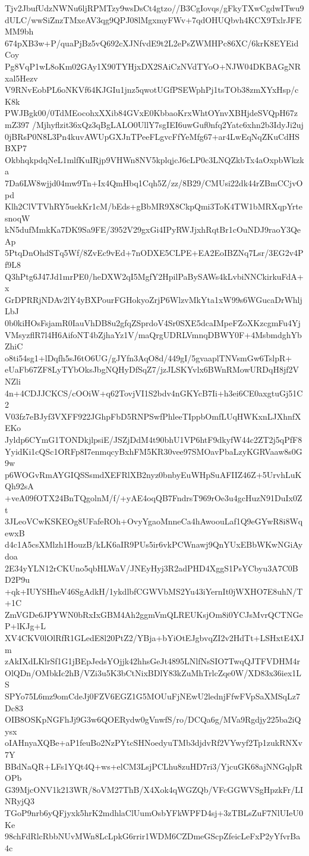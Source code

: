 Tjv2JbufUdzNWNu6ljRPMTzy9wsDsCt4gtzo//B3CgIovqs/gFkyTXwCgdwITwu9
dULC/wwSiZnzTMxeAV3qg9QPJ08lMgxmyFWv+7qdOHUQbvh4KCX9TxlrJFEMM9bh
674pXB3w+P/quaPjBz5vQ692cXJNfvdE9t2L2ePsZWMHPc86XC/6krK8EYEidCoy
Pg8VqP1wL8oKm02GAy1X90TYHjxDX2SAiCzNVdTYoO+NJW04DKBAGgNRxal5Hezv
V9RNvEobPL6oNKVf64KJGIu1jnz5qwotUGfPSEWphPj1tsTOb38zmXYxHsp/cK8k
PWJBgk00/0TdMEocohxXXib84GVxE0KbbaoKrxWhtOYnvXBHjdeSVQpH67zmZ397
/Mjhyflzit36xQz3qBgLALO0UllY7sgIEI6uwGuf0nfq2Yatc6xhn2b3IdyJi2uj
0jBRsP0N8L3Pn4kuvAWUpGXJnTPeeFLgvcFfYeMfg67+ar4LwEqNqZKuCdHSBXP7
OkbhqkpdqNeL1mlfKuIRjp9VHWn8NV5kplqjcJ6cLP0c3LNQZkbTx4aOxpbWkzka
7Da6LW8wjjd04mw9Tn+Ix4QmHbq1Cqh5Z/zz/8B29/CMUsi22dk44rZBmCCjvOpd
Klh2ClVTVhRY5uekKr1cM/bEds+gBbMR9X8CkpQmi3ToK4TW1bMRXqpYrtesnoqW
kN5dufMmkKa7DK9Sa9FE/3952V29gxGi4IPyRWJjxhRqtBr1cOuNDJ9raoY3QeAp
5PtqDnOhdSTq5Wf/8ZvEc9vEd+7nODXE5CLPE+EA2EoIBZNq7Lsr/3EG2v4Pf9L8
Q3hPtg6J47Jd1mrPE0/heDXW2qI5MgfY2HpilPaBySAWs4kLvbiNNCkirkuFdA+x
GrDPRRjNDAv2lY4yBXPourFGHokyoZrjP6WlzvMkYta1xW99s6WGucaDrWhljLbJ
0b0kiHOsFsjamR0IauVhDB8u2gfqZSprdoV4Sr0SXE5dcaIMpeFZoXKzcgmFu4Yj
VMsyzflR7l4H6AifoNT4bZjhaYz1V/maQrgUDRLVmnqDBWY0F+4MsbmdghYbZhiC
o8ti54sg1+lDqfh5sJ6tO6UG/gJYfn3AqO8d/449gI/5gvaaplTNVsmGw6TslpR+
eUaFb67ZF8LyTYbOksJbgNQHyDfSqZ7/jzJLSKYvlx6BWnRMowURDqH8jf2VNZli
4n+4CDJJCKCS/cOOiW+q62TovjVI1S2bdv4nGKYcB7Ii+h3ei6CE0axgtuGj51C2
V03fz7eBJyf3VXFF922JGhpFbD5RNPSwfPhleeTIppbOmfLUqHWKxnLJXhnfXEKo
Jyldp6CYmG1TONDkjlpsiE/JSZjDdM4t90bhU1VP6htF9dkyfW44c2ZT2j5qPfF8
YyidKi1cQSc1ORFp8I7enmqcyBxhFM5KR30vee97SMOavPbaLzyKGRVaaw8s0G9w
p6WOGvRmAYGIQSSsmdXEFRlXB2nyz0bnbyEuWHpSuAFIIZ46Z+5UrvhLuKQh92sA
+veA09fOTX24BnTQgolnM/f/+yAE4oqQB7FndrsT969rOe3u4gcHuzN91DuIx0Zt
3JLeoVCwKSKEOg8UFafeROh+OvyYgaoMnneCa4hAwoouLaf1Q9eGYwR8i8WqewxB
d4c1A5csXMlzh1HouzB/kLK6aIR9PUs5ir6vkPCWnawj9QnYUxEBbWKwNGiAydoa
2E34yYLN12rCKUno5qbHLWaV/JNEyHyj3R2adPHD4XggS1PsYCbyu3A7C0BD2P9u
+qk+IUYSHheV46SgAdkH/1ykdlbfCGWVbMS2Yu43iYernIt0jWXHO7E8uhN/T+1C
ZmVGDe6JPYWN0bRxIxGBM4Ah2ggmVmQLREUKsjOm8i0YCJsMvrQCTNGeP+lKJg+L
XV4CKV0lOlRfR1GLedE8l20PtZ2/YBja+bYiOtEJgbvqZI2v2HdTt+LSHxtE4XJm
zAkIXdLKlrSf1G1jBEpJedsYOjjk42hhsGeJt4895LNlfNsSIO7TwqQJTFVDHM4r
OlQDn/OMbkIc2hB/VZi3u5K3bCtNixBDlY83kZuMhTrlcZqe0W/XD83x36iex1LS
SPYo75L6mz9omCdeJj0FZV6EGZ1G5MOUuFjNEwU2lednjFfwFVpSaXMSqLz7Dc83
OIB8OSKpNGFhJj9G3w6QOERydw0gVnwfS/ro/DCQa6g/MVa9Rgdjy225ba2iQysx
oIAHnyaXQBe+aP1feuBo2NzPYtcSHNoedyuTMb3djdvRf2VYwyf2Tp1zukRNXv7Y
BBdNaQR+LFs1YQt4Q+ws+elCM3LsjPCLhu8zuHD7ri3/YjcuGK68ajNNGqlpROPb
G39MjcONV1k213WR/8oVM27ThB/X4Xok4qWGZQb/VFcGGWVSgHpzkFr/LINRyjQ3
TGoP9nrb6yQFjyxk5hrK2mdhlaClUumOsbYFkWPFD4sj+3zTBLsZuF7NlUIeU0Ke
98chFdRlcRbbNUvMWn8LcLpkG6rrir1WDM6CZDmeGScpZfeicLeFxP2yYfvrBa4c
